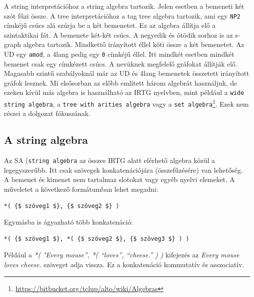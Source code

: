 A string interpretációhoz a string algebra tartozik. Jelen esetben a bemeneti két szót fűzi össze. A tree interpretációhoz a tag tree algebra tartozik, ami egy \texttt{NP2} címkéjű csúcs alá szúrja be a két bemenetet. Ez az algebra állítja elő a szintaktikai fát. A bemenete két-két csúcs.  A negyedik és ötödik sorhoz is az s-graph algebra tartozik. Mindkettő irányított éllel köti össze a két bemenetet. Az UD egy \texttt{amod}, a 4lang pedig egy \texttt{0} címkéjű éllel. Itt mindkét esetben mindkét bemenet csak egy címkézett csúcs. A nevüknek megfelelő gráfokat állítják elő. Magasabb szintű szabályoknál már az UD és 4lang bemenetek összetett irányított gráfok lesznek. Mi elsősorban az előbb említett három algebrát használjuk, de ezeken kívül más algebra is használható az IRTG nyelvben, mint például a \texttt{wide string algebra}, a \texttt{tree with arities algebra} vagy a \texttt{set algebra}\footnote{\url{https://bitbucket.org/tclup/alto/wiki/Algebras}}. Ezek nem részei a dolgozat fókuszának.



\subsection{A string algebra}
\label{sec:sa}
Az SA (\texttt{string algebra} az összes IRTG alatt elérhető algebra közül a legegyszerűbb. Itt csak szövegek konkatenációjára (összefűzésére) van lehetőség. A bemenet és kimenet nem tartalmaz slotokat vagy egyéb nyelvi elemeket. A műveletet a következő formátumban lehet megadni:
\begin{verbatim}
*( {$ szöveg1 $}, {$ szöveg2 $} )
\end{verbatim}

Egymásba is ágyazható több konkatenáció:
\begin{verbatim}
*( {$ szöveg1 $}, *( {$ szöveg2 $}, {$ szöveg3 $} ) )
\end{verbatim}

Például a \textit{*( "Every mouse”, *( “loves”, “cheese.” ) )} kifejezés az \textit{Every mouse loves cheese.} szöveget adja vissza. Ez a konkatenáció kommutatív és asszociatív.


